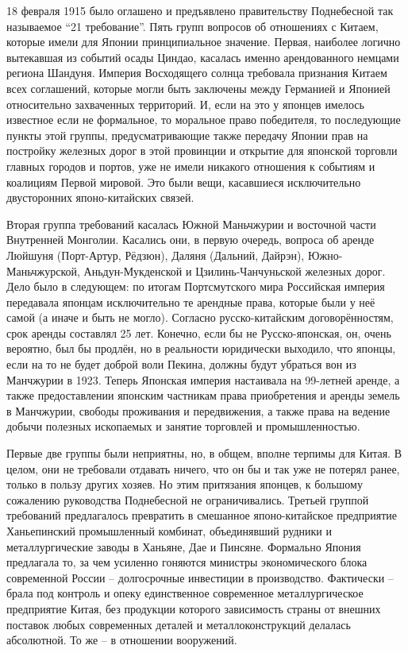 18 февраля 1915 было оглашено и предъявлено правительству Поднебесной так называемое “21 требование”. Пять групп вопросов об отношениях с Китаем, которые имели для Японии принципиальное значение. Первая, наиболее логично вытекавшая из событий осады Циндао, касалась именно арендованного немцами региона Шандуня. Империя Восходящего солнца требовала признания Китаем всех соглашений, которые могли быть заключены между Германией и Японией относительно захваченных территорий. И, если на это у японцев имелось известное если не формальное, то моральное право победителя, то последующие пункты этой группы, предусматривающие также передачу Японии прав на постройку железных дорог в этой провинции и открытие для японской торговли главных городов и портов, уже не имели никакого отношения к событиям и коалициям Первой мировой. Это были вещи, касавшиеся исключительно двусторонних японо-китайских связей.

Вторая группа требований касалась Южной Маньчжурии и восточной части Внутренней Монголии. Касались они, в первую очередь, вопроса об аренде Люйшуня (Порт-Артур, Рёдзюн), Даляня (Дальний, Дайрэн), Южно-Маньчжурской, Аньдун-Мукденской и Цзилинь-Чанчуньской железных дорог. Дело было в следующем: по итогам Портсмутского мира Российская империя передавала японцам исключительно те арендные права, которые были у неё самой (а иначе и быть не могло). Согласно русско-китайским договорённостям, срок аренды составлял 25 лет. Конечно, если бы не Русско-японская, он, очень вероятно, был бы продлён, но в реальности юридически выходило, что японцы, если на то не будет доброй воли Пекина, должны будут убраться вон из Манчжурии в 1923. Теперь Японская империя настаивала на 99-летней аренде, а также предоставлении японским частникам права приобретения и аренды земель в Манчжурии, свободы проживания и передвижения, а также права на ведение добычи полезных ископаемых и занятие торговлей и промышленностью.

Первые две группы были неприятны, но, в общем, вполне терпимы для Китая. В целом, они не требовали отдавать ничего, что он бы и так уже не потерял ранее, только в пользу других хозяев. Но этим притязания японцев, к большому сожалению руководства Поднебесной не ограничивались. Третьей группой требований предлагалось превратить в смешанное японо-китайское предприятие Ханьепинский промышленный комбинат, объединявший рудники и металлургические заводы в Ханьяне, Дае и Пинсяне. Формально Япония предлагала то, за чем усиленно гоняются министры экономического блока современной России – долгосрочные инвестиции в производство. Фактически – брала под контроль и опеку единственное современное металлургическое предприятие Китая, без продукции которого зависимость страны от внешних поставок любых современных деталей и металлоконструкций делалась абсолютной. То же – в отношении вооружений.

